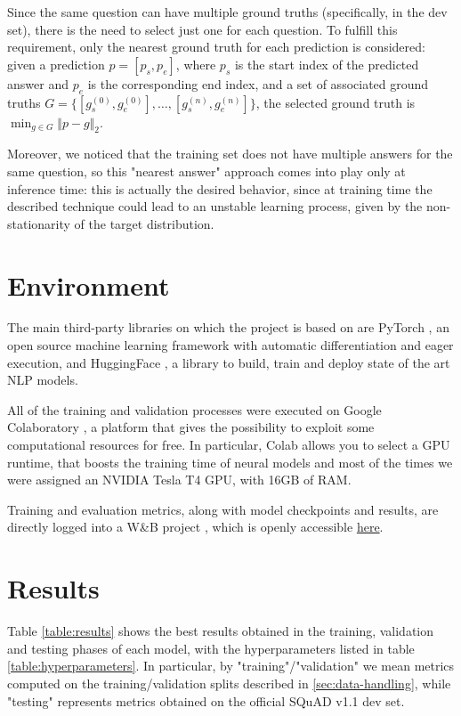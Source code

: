 \documentclass[a4paper,10pt]{report}
\begin{document}
Since the same question can have multiple ground truths (specifically, in the dev set), there is the need to select just one for each question. To fulfill this requirement, only the nearest ground truth for each prediction is considered: given a prediction $p=[p_s, p_e]$, where $p_s$ is the start index of the predicted answer and $p_e$ is the corresponding end index, and a set of associated ground truths $G=\{[g_s^{(0)},g_e^{(0)}], \dots, [g_s^{(n)},g_e^{(n)}]\}$, the selected ground truth is $\min_{g\in G}\Vert p - g\Vert_2$.

Moreover, we noticed that the training set does not have multiple answers for the same question, so this "nearest answer" approach comes into play only at inference time: this is actually the desired behavior, since at training time the described technique could lead to an unstable learning process, given by the non-stationarity of the target distribution.

\section{Environment}
The main third-party libraries on which the project is based on are PyTorch \cite{pytorch}, an open source machine learning framework with automatic differentiation and eager execution, and HuggingFace \cite{huggingface}, a library to build, train and deploy state of the art NLP models.

All of the training and validation processes were executed on Google Colaboratory \cite{colab}, a platform that gives the possibility to exploit some computational resources for free. In particular, Colab allows you to select a GPU runtime, that boosts the training time of neural models and most of the times we were assigned an NVIDIA Tesla T4 GPU, with 16GB of RAM.

Training and evaluation metrics, along with model checkpoints and results, are directly logged into a W\&B project \cite{wandb}, which is openly accessible \href{https://wandb.ai/wadaboa/squad-qa}{here}.

\section{Results}\label{sec:results}
Table \ref{table:results} shows the best results obtained in the training, validation and testing phases of each model, with the hyperparameters listed in table \ref{table:hyperparameters}. In particular, by "training"/"validation" we mean metrics computed on the training/validation splits described in \ref{sec:data-handling}, while "testing" represents metrics obtained on the official SQuAD v1.1 dev set.
\end{document}
